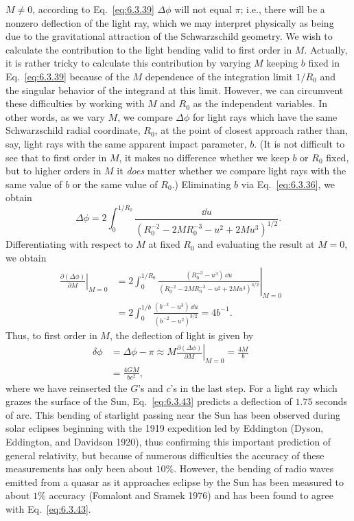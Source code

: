\(M\ne0\), according to Eq.~\eqref{eq:6.3.39} \(\Delta\phi\) will not equal
\(\pi\); i.e., there will be a nonzero deflection of the light ray, which we may
interpret physically as being due to the gravitational attraction of the
Schwarzschild geometry. We wish to calculate the contribution to the light
bending valid to first order in \(M\). Actually, it is rather tricky to calculate
this contribution by varying \(M\) keeping \(b\) fixed in Eq.~\eqref{eq:6.3.39}
because of the \(M\) dependence of the integration limit \(1/R_0\) and the
singular behavior of the integrand at this limit. However, we can circumvent these
difficulties by working with \(M\) and \(R_0\) as the independent variables. In
other words, as we vary \(M\), we compare \(\Delta\phi\) for light rays which
have the same Schwarzschild radial coordinate, \(R_0\), at the point of closest
approach rather than, say, light rays with the same apparent impact parameter,
\(b\). (It is not difficult to see that to first order in \(M\), it makes no
difference whether we keep \(b\) or \(R_0\) fixed, but to higher orders in \(M\)
it \emph{does} matter whether we compare light rays with the same value of \(b\)
or the same value of \(R_0\).) Eliminating \(b\) via Eq.~\eqref{eq:6.3.36}, we
obtain
\begin{equation}
  \Delta\phi=2\int_0^{1/R_0}
  \frac{\dd u}{(R_0^{-2}-2MR_0^{-3}-u^2+2Mu^3)^{1/2}}.
  \tag{6.3.41}\label{eq:6.3.41}
\end{equation}
Differentiating with respect to \(M\) at fixed \(R_0\) and evaluating the result
at \(M=0\), we obtain
\begin{align}
  \left.\frac{\partial(\Delta\phi)}{\partial M}\right|_{M=0}
    &=2\left.\int_0^{1/R_0}
       \frac{(R_0^{-3}-u^3)\,\dd u}
       {(R_0^{-2}-2MR_0^{-3}-u^2+2Mu^3)^{3/2}}\right|_{M=0}\nonumber\\
    &=2\int_0^{1/b}\frac{(b^{-3}-u^3)\,\dd u}{(b^{-2}-u^2)^{3/2}}
      =4b^{-1}.
  &&\tag{6.3.42}\label{eq:6.3.42}
\end{align}
Thus, to first order in \(M\), the deflection of light is given by
\begin{align}
  \delta\phi
    &=\Delta\phi-\pi
      \approx M\left.\frac{\partial(\Delta\phi)}{\partial M}\right|_{M=0}
      =\frac{4M}{b}\nonumber\\
    &=\frac{4GM}{bc^2},
  &&\tag{6.3.43}\label{eq:6.3.43}
\end{align}
where we have reinserted the \(G\)'s and \(c\)'s in the last step. For a light
ray which grazes the surface of the Sun, Eq.~\eqref{eq:6.3.43} predicts a
deflection of \(1.75\) seconds of arc. This bending of starlight passing near the
Sun has been observed during solar eclipses beginning with the 1919 expedition led
by Eddington (Dyson, Eddington, and Davidson 1920), thus confirming this important
prediction of general relativity, but because of numerous difficulties the
accuracy of these measurements has only been about \(10\%\). However, the bending
of radio waves emitted from a quasar as it approaches eclipse by the Sun has been
measured to about \(1\%\) accuracy (Fomalont and Sramek 1976) and has been found
to agree with Eq.~\eqref{eq:6.3.43}.

